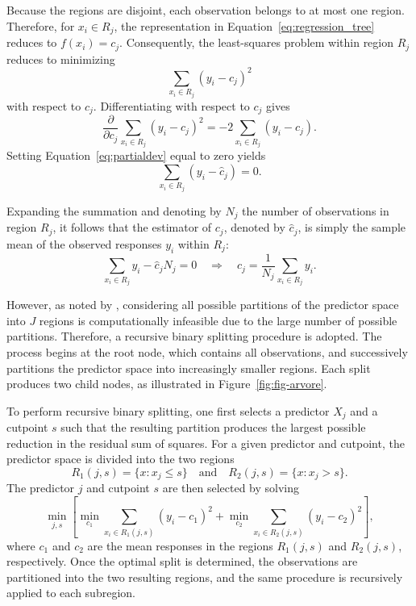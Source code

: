 Because the regions are disjoint, each observation belongs to at most one
region. Therefore, for $x_i \in R_j$, the representation in
Equation~\eqref{eq:regression_tree} reduces to $f\left(x_i\right) = c_j$.
Consequently, the least-squares problem within region $R_j$ reduces to
minimizing
\begin{equation}
\sum_{x_i \in R_j} \left(y_i-c_j\right)^2
\end{equation}
with respect to $c_j$. Differentiating with respect to $c_j$ gives
\begin{equation}
\label{eq:partialdev}
\frac{\partial}{\partial c_j}
\sum_{x_i \in R_j} \left(y_i-c_j\right)^2
=
-2\sum_{x_i \in R_j}\left(y_i-c_j\right).
\end{equation}
Setting Equation~\eqref{eq:partialdev} equal to zero yields
\begin{equation}
\sum_{x_i \in R_j}
\left(y_i-\hat{c}_j\right)=0.
\end{equation}

Expanding the summation and denoting by $N_j$ the number of observations
in region $R_j$, it follows that the estimator of $c_j$, denoted by
$\hat{c}_j$, is simply the sample mean of the observed responses $y_i$
within $R_j$:
\begin{equation}
\label{eq:estimacjdev}
\sum_{x_i \in R_j} y_i - \hat{c}_j N_j = 0
\quad\Rightarrow\quad
\hat{c}_j =
\frac{1}{N_j}\sum_{x_i \in R_j} y_i.
\end{equation}

However, as noted by , considering all
possible partitions of the predictor space into $J$ regions is
computationally infeasible due to the large number of possible
partitions. Therefore, a recursive binary splitting procedure is adopted.
The process begins at the root node, which contains all observations, and
successively partitions the predictor space into increasingly smaller
regions. Each split produces two child nodes, as illustrated in
Figure~\ref{fig:fig-arvore}.

To perform recursive binary splitting, one first selects a predictor
$X_j$ and a cutpoint $s$ such that the resulting partition produces the
largest possible reduction in the residual sum of squares. For a given
predictor and cutpoint, the predictor space is divided into the two
regions
\begin{equation}
R_{1}(j,s) = \{x : x_j \leq s\}
\quad\text{and}\quad
R_{2}(j,s) = \{x : x_j > s\}.
\end{equation}
The predictor $j$ and cutpoint $s$ are then selected by solving
\begin{equation}
\min_{j,s}
\left[
\min_{c_1}
\sum_{x_i \in R_1(j,s)}
\left(y_i-c_1\right)^2
+
\min_{c_2}
\sum_{x_i \in R_2(j,s)}
\left(y_i-c_2\right)^2
\right],
\end{equation}
where $c_1$ and $c_2$ are the mean responses in the regions
$R_1(j,s)$ and $R_2(j,s)$, respectively. Once the optimal split is
determined, the observations are partitioned into the two resulting
regions, and the same procedure is recursively applied to each
subregion.

